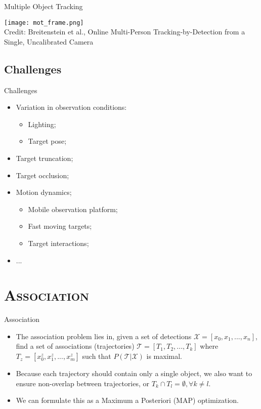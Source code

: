 \begin{frame}{Multiple Object Tracking}
	\begin{center}
		\texttt{[image: mot\_frame.png]}\\[-1ex]
		{\tiny Credit: Breitenstein et al., Online Multi-Person Tracking-by-Detection from a Single, Uncalibrated Camera}
	\end{center}
\end{frame}


\subsection{Challenges}
\begin{frame}{Challenges}
	\begin{itemize}
		\item Variation in observation conditions:
		\begin{itemize}
			\item Lighting;
			\item Target pose;
		\end{itemize}
		\item Target truncation;
		\item Target occlusion;
		\item Motion dynamics;
		\begin{itemize}
			\item Mobile observation platform;
			\item Fast moving targets;
			\item Target interactions;
		\end{itemize}
		\item ...
	\end{itemize}
\end{frame}



\section{\scshape Association}
\begin{frame}{Association}
	\begin{itemize}
		\item The association problem lies in, given a set of detections $\mathcal{X} = [x_0, x_1, ..., x_n]$, find a set of associations (trajectories) $\mathcal{T} = [T_1, T_2, ..., T_k]$ where $T_z = [x^z_0, x^z_1, ..., x^z_m]$ such that $P(\mathcal{T}|\mathcal{X})$ is maximal.
		\item Because each trajectory should contain only a single object, we also want to ensure non-overlap between trajectories, or $T_k \cap T_l = \emptyset, \forall k \neq l$.
		\item We can formulate this as a Maximum a Posteriori (MAP) optimization.
	\end{itemize}
\end{frame}

